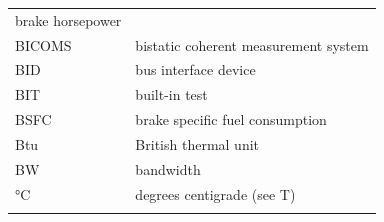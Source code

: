 \documentclass[
]{book}
\begin{document}
\begin{longtable}[]{@{}ll@{}}
\begin{minipage}[t]{0.47\columnwidth}
brake horsepower\strut
\end{minipage}\tabularnewline
\begin{minipage}[t]{0.47\columnwidth}\raggedright
BICOMS\strut
\end{minipage} & \begin{minipage}[t]{0.47\columnwidth}\raggedright
bistatic coherent measurement system\strut
\end{minipage}\tabularnewline
\begin{minipage}[t]{0.47\columnwidth}\raggedright
BID\strut
\end{minipage} & \begin{minipage}[t]{0.47\columnwidth}\raggedright
bus interface device\strut
\end{minipage}\tabularnewline
\begin{minipage}[t]{0.47\columnwidth}\raggedright
BIT\strut
\end{minipage} & \begin{minipage}[t]{0.47\columnwidth}\raggedright
built-in test\strut
\end{minipage}\tabularnewline
\begin{minipage}[t]{0.47\columnwidth}\raggedright
BSFC\strut
\end{minipage} & \begin{minipage}[t]{0.47\columnwidth}\raggedright
brake specific fuel consumption\strut
\end{minipage}\tabularnewline
\begin{minipage}[t]{0.47\columnwidth}\raggedright
Btu\strut
\end{minipage} & \begin{minipage}[t]{0.47\columnwidth}\raggedright
British thermal unit\strut
\end{minipage}\tabularnewline
\begin{minipage}[t]{0.47\columnwidth}\raggedright
BW\strut
\end{minipage} & \begin{minipage}[t]{0.47\columnwidth}\raggedright
bandwidth\strut
\end{minipage}\tabularnewline
\begin{minipage}[t]{0.47\columnwidth}\raggedright
°C\strut
\end{minipage} & \begin{minipage}[t]{0.47\columnwidth}\raggedright
degrees centigrade (see T)\strut
\end{minipage}\tabularnewline
\begin{minipage}[t]{0.47\columnwidth}\raggedright

\end{minipage}
\end{longtable}
\end{document}
